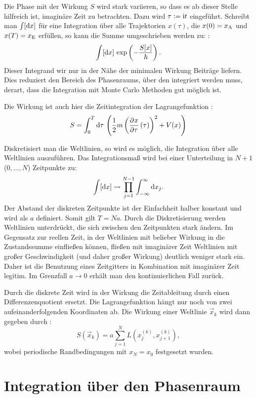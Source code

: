 Die Phase mit der Wirkung $S$ wird stark variieren, so dass es ab dieser Stelle
hilfreich ist, imaginäre Zeit zu betrachten. Dazu wird $\tau := \mathrm i t$
eingeführt. Schreibt man $\int [\dif x]$ für eine Integration über alle
Trajektorien $x(\tau)$, die $x(0) = x_\text A$ und $x(T) = x_\text E$ erfüllen,
so kann die Summe umgeschrieben werden zu:
\parencite[(2.1)]{Creutz/Statistical_Approach_QM}:
\[
    \int [\dif x] \, \exp\del{-\frac{S[x]}\hbar}.
\]
Dieser Integrand wir nur in der Nähe der minimalen Wirkung Beiträge liefern.
Dies reduziert den Bereich des Phasenraums, über den integriert werden muss,
derart, dass die Integration mit Monte Carlo Methoden gut möglich ist.

Die Wirkung ist auch hier die Zeitintegration der Lagrangefunktion
\parencite[(2.5)]{Creutz/Statistical_Approach_QM}:
\[
    S = \int_0^T \dif \tau \, \del{\frac 12 m \del{\dpd x\tau(\tau)}^2 + V(x)}
\]

Diskretisiert man die Weltlinien, so wird es möglich, die Integration über alle
Weltlinien auszuführen. Das Integrationsmaß wird bei einer Unterteilung in
$N+1$ ($0, \ldots, N$)
Zeitpunkte zu:
\[
    \int [\dif x] \leadsto \prod_{j = 1}^{N-1} \int_{-\infty}^\infty \dif x_j.
\]
Der Abstand der diskreten Zeitpunkte ist der Einfachheit halber konstant und
wird als $a$ definiert. Somit gilt $T = Na$. Durch die Diskretisierung werden
Weltlinien unterdrückt, die sich zwischen den Zeitpunkten stark ändern. Im
Gegensatz zur reellen Zeit, in der Weltlinien mit belieber Wirkung in die
Zustandssumme einfließen können, fließen mit imaginärer Zeit Weltlinien mit
großer Geschwindigkeit (und daher großer Wirkung) deutlich weniger stark ein.
Daher ist die Benutzung eines Zeitgitters in Kombination mit imaginärer Zeit
legitim. Im Grenzfall $a \to 0$ erhält man den kontinuierlichen Fall zurück.

Durch die diskrete Zeit wird in der Wirkung die Zeitableitung durch einen
Differenzenquotient ersetzt. Die Lagrangefunktion hängt nur noch von zwei
aufeinanderfolgenden Koordinaten ab. Die Wirkung einer Weltlinie $\vec x_k$
wird dann gegeben durch
\parencite[(3.2)]{Creutz/Statistical_Approach_QM}:
\[
    S(\vec x_k) = a \sum_{j = 1}^N L(x_j^{(k)}, x_{j+1}^{(k)}),
\]
wobei periodische Randbedingungen mit $x_{N} = x_0$ festgesetzt wurden.

\section{Integration über den Phasenraum}

